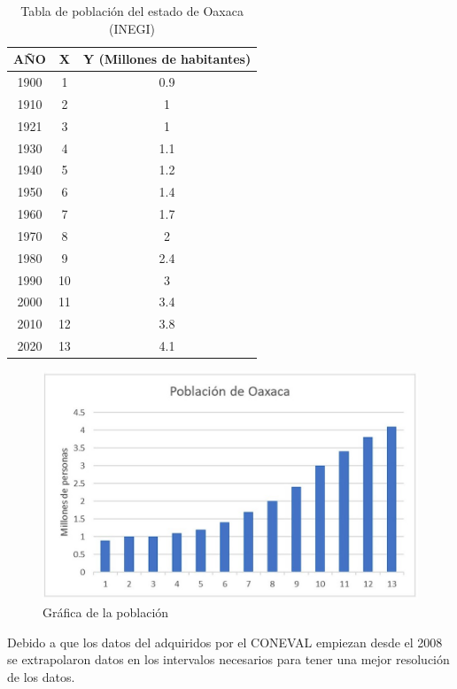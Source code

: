 \begin{table}[h]
\centering
\begin{tabular}{|c|c|c|}
\hline
\textbf{AÑO} & \textbf{X} & \textbf{Y (Millones de habitantes)} \\
\hline
1900 & 1 & 0.9 \\
1910 & 2 & 1 \\
1921 & 3 & 1 \\
1930 & 4 & 1.1 \\
1940 & 5 & 1.2 \\
1950 & 6 & 1.4 \\
1960 & 7 & 1.7 \\
1970 & 8 & 2 \\
1980 & 9 & 2.4 \\
1990 & 10 & 3 \\
2000 & 11 & 3.4 \\
2010 & 12 & 3.8 \\
2020 & 13 & 4.1 \\
\hline
\end{tabular}
\caption{Tabla de población del estado de Oaxaca (INEGI)}
\label{tab:tablaPoblacionOaxaca}
\end{table}

\begin{figure}[H]
    \centering	
    \includegraphics[width=.8\textwidth]{img/Empresa/GraficaPoblacion.jpg} 
    \caption{Gráfica de la población}
\label{fig:GraficaPoblacionOaxaca}
\end{figure}

Debido a que los datos del adquiridos por el CONEVAL empiezan desde el 2008 se extrapolaron datos en los intervalos necesarios para tener una mejor resolución de los datos.

